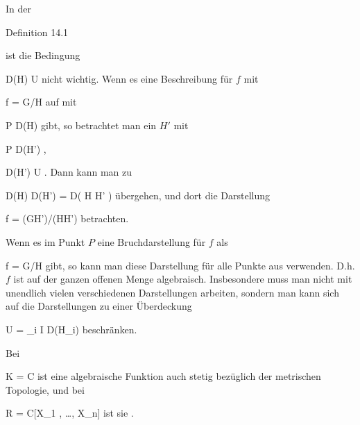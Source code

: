 {}
{





In der

Definition 14.1

ist die Bedingung

\mavergleichskette
{\vergleichskette
{ D(H)
}
{ \subseteq }{ U
}
{  }{
}
{    }{
}
{   }{
}
}
{}{}{}
nicht wichtig. Wenn es eine Beschreibung für $f$ mit

\mavergleichskette
{\vergleichskette
{ f
}
{ = }{ G/H
}
{  }{
}
{    }{
}
{   }{
}
}
{}{}{}
auf
 mit

\mavergleichskette
{\vergleichskette
{ P
}
{ \in }{ D(H)
}
{  }{
}
{    }{
}
{   }{
}
}
{}{}{}
gibt, so betrachtet man ein $H'$ mit

\mavergleichskette
{\vergleichskette
{ P
}
{ \in }{ D(H')
}
{  }{
}
{    }{
}
{   }{
}
}
{}{}{,}

\mavergleichskette
{\vergleichskette
{ D(H')
}
{ \subseteq }{ U
}
{  }{
}
{    }{
}
{   }{
}
}
{}{}{.}
Dann kann man zu

\mavergleichskette
{\vergleichskette
{ D(H) \cap D(H')
}
{ = }{ D( H H' )
}
{  }{
}
{    }{
}
{   }{
}
}
{}{}{}
übergehen, und dort die Darstellung

\mavergleichskette
{\vergleichskette
{ f
}
{ = }{ (GH')/(HH')
}
{  }{
}
{    }{
}
{   }{
}
}
{}{}{}
betrachten.

Wenn es im Punkt $P$ eine Bruchdarstellung für $f$ als

\mavergleichskette
{\vergleichskette
{ f
}
{ = }{ G/H
}
{  }{
}
{    }{
}
{   }{
}
}
{}{}{}
gibt, so kann man diese Darstellung für alle Punkte aus
 verwenden. D.h. $f$ ist auf der ganzen offenen Menge
 algebraisch. Insbesondere muss man nicht mit unendlich vielen verschiedenen Darstellungen arbeiten, sondern man kann sich auf die
 {} {}
Darstellungen
 zu einer Überdeckung

\mavergleichskette
{\vergleichskette
{ U
}
{ = }{ \bigcup_{i \in I} D(H_i)
}
{  }{
}
{    }{
}
{   }{
}
}
{}{}{}
beschränken.

Bei

\mavergleichskette
{\vergleichskette
{ K
}
{ = }{ {\mathbb C}
}
{  }{
}
{    }{
}
{   }{
}
}
{}{}{}
ist eine algebraische Funktion auch stetig bezüglich der metrischen Topologie, und bei

\mavergleichskette
{\vergleichskette
{ R
}
{ = }{ {\mathbb C}[X_1 , \ldots , X_n]
}
{  }{
}
{    }{
}
{   }{
}
}
{}{}{}
ist sie  {.}





}

